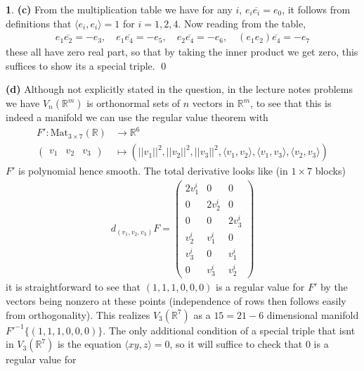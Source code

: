 \documentclass[10.5pt]{article}
\theoremstyle{definition}
\newtheorem{pb}{}
\newcommand{\set}[1]{\{#1\}}
\newcommand{\gen}[1]{\langle#1\rangle}
\newcommand{\norm}[1]{\lvert\lvert#1\rvert\rvert}
\begin{document}
\begin{pb}
        \textbf{(c)} From the multiplication table we have for any \(i\), \(e_i \overline{e_i} = e_0\), it follows from definitions that \(\gen{e_i,e_i} = 1\) for \(i = 1,2,4\). Now reading from the table,
        \begin{align*}
            e_1 \overline{e_2} = -e_3, \quad e_1 \overline{e_4} = - e_5, \quad e_2 \overline{e_4} = -e_6, \quad (e_1e_2)\overline{e_4} = -e_7
        \end{align*}
        these all have zero real part, so that by taking the inner product we get zero, this suffices to show its a special triple. \qed

        \textbf{(d)} Although not explicitly stated in the question, in the lecture notes problems we have \(V_n(\mathbb{R}^m)\) is orthonormal sets of \(n\) vectors in \(\mathbb{R}^m\), to see that this is indeed a manifold we can use the regular value theorem with
        \begin{align*}
            F': \text{Mat}_{3\times 7}(\mathbb{R}) &\to \mathbb{R}^6 \\
            \begin{pmatrix} v_1&v_2&v_3 \end{pmatrix} &\mapsto (\norm{v_1}^2,\norm{v_2}^2,\norm{v_3}^2,\gen{v_1,v_2},\gen{v_1,v_3},\gen{v_2,v_3})
        \end{align*}
        \(F'\) is polynomial hence smooth. The total derivative looks like (in \(1 \times 7\) blocks)
        \begin{align*}
            d_{(v_1,v_2,v_3)}F = \begin{pmatrix} 2v_1^i & 0 & 0 \\ 0 & 2v_2^i & 0 \\ 0&0& 2v_3^i \\ v_2^i & v_1^i & 0 \\ v_3^i & 0 & v_1^i \\ 0 & v_3^i & v_2^i \end{pmatrix}
        \end{align*}
        it is straightforward to see that \((1,1,1,0,0,0)\) is a regular value for \(F'\) by the vectors being nonzero at these points (independence of rows then follows easily from orthogonality). This realizes \(V_3(\mathbb{R}^7)\) as a \(15 = 21 - 6\) dimensional manifold \(F'^{-1}\set{(1,1,1,0,0,0)}\). The only additional condition of a special triple that isnt in \(V_3(\mathbb{R}^7)\) is the equation \(\gen{xy,z} = 0\), so it will suffice to check that \(0\) is a regular value for
        \begin{align*}

\end{align*}
\end{pb}
\end{document}
